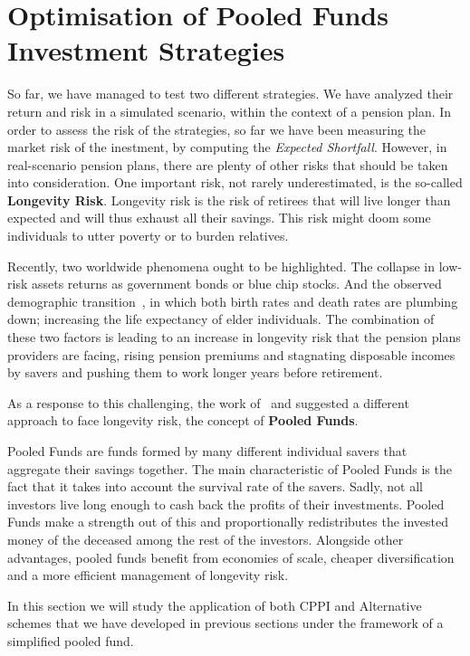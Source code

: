 \section{Optimisation of Pooled Funds Investment Strategies}

So far, we have managed to test two different strategies. We have analyzed their return and risk in a simulated scenario, within the context of a pension plan. In order to assess the risk of the strategies, so far we have been measuring the market risk of the inestment, by computing the \emph{Expected Shortfall}. However, in real-scenario pension plans, there are plenty of other risks that should be taken into consideration. One important risk, not rarely underestimated, is the so-called \textbf{Longevity Risk}. Longevity risk is the risk of retirees that will live longer than expected and will thus exhaust all their savings. This risk might doom some individuals to utter poverty or to burden relatives.

Recently, two worldwide phenomena ought to be highlighted. The collapse in low-risk assets returns as government bonds or blue chip stocks. And the observed demographic transition~\textcite{b:demographic, a:bongaarts-human}, in which both birth rates and death rates are plumbing down; increasing the life expectancy of elder individuals. The combination of these two factors is leading to an increase in longevity risk that the pension plans providers are facing, rising pension premiums and stagnating disposable incomes by savers and pushing them to work longer years before retirement.

As a response to this challenging, the work of~\cite{a:donnelly-transparency} and \cite{a:brautigam-pool} suggested a different approach to face longevity risk, the concept of \textbf{Pooled Funds}.

Pooled Funds are funds formed by many different individual savers that aggregate their savings together. The main characteristic of Pooled Funds is the fact that it takes into account the survival rate of the savers. Sadly, not all investors live long enough to cash back the profits of their investments. Pooled Funds make a strength out of this and proportionally redistributes the invested money of the deceased among the rest of the investors. Alongside other advantages, pooled funds benefit from economies of scale, cheaper diversification and a more efficient management of longevity risk.

In this section we will study the application of both CPPI and Alternative schemes that we have developed in previous sections under the framework of a simplified pooled fund.

